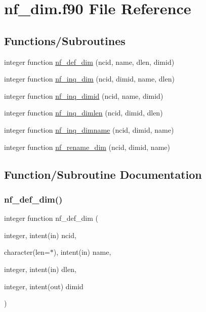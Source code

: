 \hypertarget{nf__dim_8f90}{}\section{nf\+\_\+dim.\+f90 File Reference}
\label{nf__dim_8f90}
\subsection*{Functions/\+Subroutines}
\begin{DoxyCompactItemize}
\item 
integer function \hyperlink{nf__dim_8f90_a7240ef1f2f77f9384e89d6fbb7efa2e4}{nf\+\_\+def\+\_\+dim} (ncid, name, dlen, dimid)
\item 
integer function \hyperlink{nf__dim_8f90_acc7d09ee1f217ff454bf44e513c96cfa}{nf\+\_\+inq\+\_\+dim} (ncid, dimid, name, dlen)
\item 
integer function \hyperlink{nf__dim_8f90_a13052e9476061a38bbc565fddce6af46}{nf\+\_\+inq\+\_\+dimid} (ncid, name, dimid)
\item 
integer function \hyperlink{nf__dim_8f90_a59a9fd1ab9aac41ed35c4f41c18e5568}{nf\+\_\+inq\+\_\+dimlen} (ncid, dimid, dlen)
\item 
integer function \hyperlink{nf__dim_8f90_a6904228d7ca66bd37d8f8728881ee73c}{nf\+\_\+inq\+\_\+dimname} (ncid, dimid, name)
\item 
integer function \hyperlink{nf__dim_8f90_a4aeb7c8253e9a2d1e5ea12fbf700c5f4}{nf\+\_\+rename\+\_\+dim} (ncid, dimid, name)
\end{DoxyCompactItemize}


\subsection{Function/\+Subroutine Documentation}
\mbox{\label{nf__dim_8f90_a7240ef1f2f77f9384e89d6fbb7efa2e4}} 
\subsubsection{\texorpdfstring{nf\+\_\+def\+\_\+dim()}{nf\_def\_dim()}}
{\footnotesize\ttfamily integer function nf\+\_\+def\+\_\+dim (\begin{DoxyParamCaption}\item[{integer, intent(in)}]{ncid,  }\item[{character(len=$\ast$), intent(in)}]{name,  }\item[{integer, intent(in)}]{dlen,  }\item[{integer, intent(out)}]{dimid }\end{DoxyParamCaption})}



